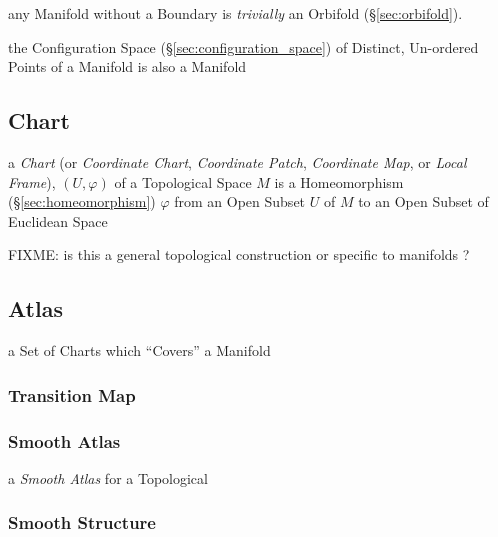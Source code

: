 \fist any Manifold without a Boundary is \emph{trivially} an Orbifold
(\S\ref{sec:orbifold}).

the Configuration Space (\S\ref{sec:configuration_space}) of Distinct,
Un-ordered Points of a Manifold is also a Manifold



\subsection{Chart}\label{sec:chart}

a \emph{Chart} (or \emph{Coordinate Chart}, \emph{Coordinate Patch},
\emph{Coordinate Map}, or \emph{Local Frame}), $(U, \varphi)$ of a Topological
Space $M$ is a Homeomorphism (\S\ref{sec:homeomorphism}) $\varphi$ from an Open
Subset $U$ of $M$ to an Open Subset of Euclidean Space

FIXME: is this a general topological construction or specific to manifolds ?



\subsection{Atlas}\label{sec:atlas}

a Set of Charts which ``Covers'' a Manifold



\subsubsection{Transition Map}\label{sec:transition_map}

\subsubsection{Smooth Atlas}\label{sec:smooth_atlas}

a \emph{Smooth Atlas} for a Topological



\subsubsection{Smooth Structure}\label{sec:smooth_structure}

